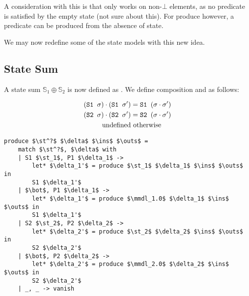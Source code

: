 A consideration with this is that  only works on non-$\bot$ elements, as no predicate is satisfied by the empty state (not sure about this). For produce however, a predicate can be produced from the absence of state.

We may now redefine some of the state models with this new idea.

\subsection{State Sum}

A state sum $\mathbb S_1 \oplus \mathbb S_2$ is now defined as . We define composition and  as follows:

\begin{align*}
	(\texttt{S1 }\sigma)\cdot(\texttt{S1 }\sigma') &= \texttt{S1 }(\sigma\cdot\sigma')\\
	(\texttt{S2 }\sigma)\cdot(\texttt{S2 }\sigma') &= \texttt{S2 }(\sigma\cdot\sigma')\\
	\text{undefined}&\text{ otherwise}
\end{align*}

\begin{lstlisting}
produce $\st^?$ $\delta$ $\ins$ $\outs$ =
	match $\st^?$, $\delta$ with
	| S1 $\st_1$, P1 $\delta_1$ -> 
		let* $\delta_1'$ = produce $\st_1$ $\delta_1$ $\ins$ $\outs$ in
		S1 $\delta_1'$
	| $\bot$, P1 $\delta_1$ ->
		let* $\delta_1'$ = produce $\mmdl_1.0$ $\delta_1$ $\ins$ $\outs$ in
		S1 $\delta_1'$
	| S2 $\st_2$, P2 $\delta_2$ -> 
		let* $\delta_2'$ = produce $\st_2$ $\delta_2$ $\ins$ $\outs$ in
		S2 $\delta_2'$
	| $\bot$, P2 $\delta_2$ -> 
		let* $\delta_2'$ = produce $\mmdl_2.0$ $\delta_2$ $\ins$ $\outs$ in
		S2 $\delta_2'$
	| _, _ -> vanish
\end{lstlisting}

